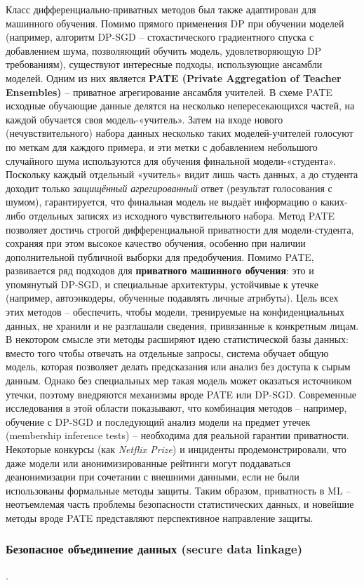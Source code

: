 Класс дифференциально-приватных методов был также адаптирован для машинного обучения. Помимо прямого применения DP при обучении моделей (например, алгоритм DP-SGD – стохастического градиентного спуска с добавлением шума, позволяющий обучить модель, удовлетворяющую DP требованиям), существуют интересные подходы, использующие ансамбли моделей. Одним из них является \textbf{PATE (Private Aggregation of Teacher Ensembles)} – приватное агрегирование ансамбля учителей. В схеме PATE исходные обучающие данные делятся на несколько непересекающихся частей, на каждой обучается своя модель-«учитель». Затем на входе нового (нечувствительного) набора данных несколько таких моделей-учителей голосуют по меткам для каждого примера, и эти метки с добавлением небольшого случайного шума используются для обучения финальной модели-«студента». Поскольку каждый отдельный «учитель» видит лишь часть данных, а до студента доходит только \textit{защищённый агрегированный} ответ (результат голосования с шумом), гарантируется, что финальная модель не выдаёт информацию о каких-либо отдельных записях из исходного чувствительного набора.
Метод PATE позволяет достичь строгой дифференциальной приватности для модели-студента, сохраняя при этом высокое качество обучения, особенно при наличии дополнительной публичной выборки для предобучения. Помимо PATE, развивается ряд подходов для \textbf{приватного машинного обучения}: это и упомянутый DP-SGD, и специальные архитектуры, устойчивые к утечке (например, автоэнкодеры, обученные подавлять личные атрибуты). Цель всех этих методов – обеспечить, чтобы модели, тренируемые на конфиденциальных данных, не хранили и не разглашали сведения, привязанные к конкретным лицам. В некотором смысле эти методы расширяют идею статистической базы данных: вместо того чтобы отвечать на отдельные запросы, система обучает общую модель, которая позволяет делать предсказания или анализ без доступа к сырым данным. Однако без специальных мер такая модель может оказаться источником утечки, поэтому внедряются механизмы вроде PATE или DP-SGD. Современные исследования в этой области показывают, что комбинация методов – например, обучение с DP-SGD и последующий анализ модели на предмет утечек (membership inference tests) – необходима для реальной гарантии приватности. Некоторые конкурсы (как \textit{Netflix Prize}) и инциденты продемонстрировали, что даже модели или анонимизированные рейтинги могут поддаваться деанонимизации при сочетании с внешними данными, если не были использованы формальные методы защиты. Таким образом, приватность в ML – неотъемлемая часть проблемы безопасности статистических данных, и новейшие методы вроде PATE представляют перспективное направление защиты. \subsubsection{Безопасное объединение данных (secure data linkage)}.
